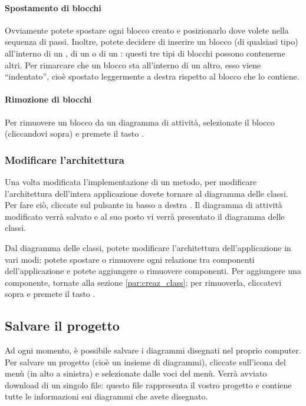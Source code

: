 \paragraph{Spostamento di blocchi} Ovviamente potete spostare ogni blocco creato e posizionarlo dove volete nella sequenza di passi. Inoltre, potete decidere di inserire un blocco (di qualsiasi tipo) all'interno di un , di un  o di un : questi tre tipi di blocchi possono contenerne altri. Per rimarcare che un blocco sta all'interno di un altro, esso viene “indentato”, cioè spostato leggermente a destra rispetto al blocco che lo contiene.

\paragraph{Rimozione di blocchi} Per rimuovere un blocco da un diagramma di attività, selezionate il blocco (cliccandovi sopra) e premete il tasto .

\subsubsection{Modificare l'architettura}
Una volta modificata l'implementazione di un metodo, per modificare l'architettura dell'intera applicazione dovete tornare al diagramma delle classi. Per fare ciò, cliccate sul pulsante in basso a destra . Il diagramma di attività modificato verrà salvato e al suo posto vi verrà presentato il diagramma delle classi.

Dal diagramma delle classi, potete modificare l'architettura dell'applicazione in vari modi: potete spostare o rimuovere ogni relazione tra componenti dell'applicazione e potete aggiungere o rimuovere componenti. Per aggiungere una componente, tornate alla sezione \ref{par:creaz_class}; per rimuoverla, cliccatevi sopra e premete il tasto .



\subsection{Salvare il progetto} \label{sec:save} %

Ad ogni momento, è possibile salvare i diagrammi disegnati nel proprio computer. Per salvare un progetto (cioè un insieme di diagrammi), cliccate sull'icona del menù (in alto a sinistra) e selezionate  dalle voci del menù. Verrà avviato download di un singolo file: questo file rappresenta il vostro progetto e contiene tutte le informazioni sui diagrammi che avete disegnato.



